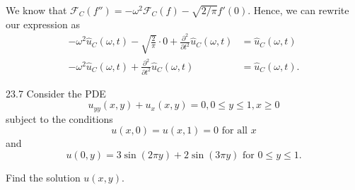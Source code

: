 \begin{derivation}
  We know that $\mathcal{F}_C(f'') = -\omega^2 \mathcal{F}_C(f) - \sqrt{2 / \pi} f'(0)$.
  Hence, we can rewrite our expression as
  \begin{align*}
    - \omega^2 \hat{u}_C(\omega, t) - \sqrt{\frac{2}{\pi}} \cdot 0 + \frac{\partial ^2}{\partial t^2} \hat{u}_C(\omega,t ) &= \hat{u}_C (\omega, t) \\
    - \omega^2 \hat{u}_C(\omega, t) + \frac{\partial ^2}{\partial t^2} \hat{u}_C(\omega, t) &= \hat{u}_C(\omega, t)
  .\end{align*}
\end{derivation}


\begin{problem}{23.7}
  Consider the PDE
  \begin{equation*}
    u_{y y}(x,y) + u_x(x,y) = 0, 0 \leq y \leq 1, x \geq 0
  \end{equation*}
  subject to the conditions
  \begin{equation*}
    u(x,0) = u(x,1) = 0 \text{ for all } x
  \end{equation*}
  and
  \begin{equation*}
    u(0,y) = 3 \sin (2\pi y) + 2 \sin (3\pi y) \text{ for } 0 \leq y \leq 1
  .\end{equation*}
  
  Find the solution $u(x,y)$.
\end{problem}

